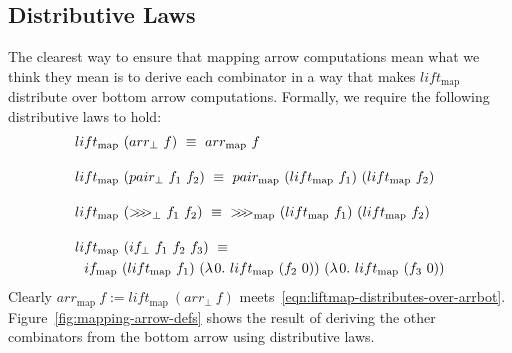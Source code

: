 \documentclass[preprint]{sigplanconf}
\newcommand{\arrowlift}{\ensuremath{lift}}
\newcommand{\arrowarr}{\ensuremath{arr}}
\newcommand{\arrowcomp}{\ensuremath{{>}\mspace{-6mu}{>}\mspace{-6mu}{>}}}
\newcommand{\arrowpair}{\ensuremath{pair}}
\newcommand{\arrowif}{\ensuremath{if}}
\newcommand{\arrbot}{\arrowarr_\bot}
\newcommand{\compbot}{\arrowcomp_\bot}
\newcommand{\pairbot}{\arrowpair_\bot}
\newcommand{\ifbot}{\arrowif_\bot}
\newcommand{\map}{_\mathrm{map}}
\newcommand{\liftmap}{\arrowlift\map}
\newcommand{\arrmap}{\arrowarr\map}
\newcommand{\compmap}{\arrowcomp\map}
\newcommand{\pairmap}{\arrowpair\map}
\newcommand{\ifmap}{\arrowif\map}
\begin{document}
\subsection{Distributive Laws}

The clearest way to ensure that mapping arrow computations mean what we think they mean is to derive each combinator in a way that makes $\liftmap$ distribute over bottom arrow computations. Formally, we require the following distributive laws to hold:
\begin{align}
	&\begin{aligned}
		\liftmap~(\arrbot~f) \ \equiv \ \arrmap~f
	\label{eqn:liftmap-distributes-over-arrbot}
	\end{aligned} \\
\nonumber \\[-6pt]
	&\begin{aligned}
		\liftmap~(\pairbot~f_1~f_2) \ \equiv \ \pairmap~(\liftmap~f_1)~(\liftmap~f_2)
	\label{eqn:liftmap-distributes-over-pairbot}
	\end{aligned} \\
\nonumber \\[-6pt]
	&\begin{aligned}
		\liftmap~(\compbot~f_1~f_2) \ \equiv \ \compmap~(\liftmap~f_1)~(\liftmap~f_2)
	\label{eqn:liftmap-distributes-over-compbot}
	\end{aligned} \\
\nonumber \\[-6pt]
	&\begin{aligned}
		&\liftmap~(\ifbot~f_1~f_2~f_3) \ \equiv \ \\
		&\ \ \ifmap~(\liftmap~f_1)~(\fun{0}{\liftmap~(f_2~0)})~(\fun{0}{\liftmap~(f_3~0)})
	\label{eqn:liftmap-distributes-over-ifbot}
	\end{aligned}
\end{align}
Clearly $\arrmap~f := \liftmap~(\arrbot~f)$ meets~\eqref{eqn:liftmap-distributes-over-arrbot}.
Figure~\ref{fig:mapping-arrow-defs} shows the result of deriving the other combinators from the bottom arrow using distributive laws.
\end{document}
